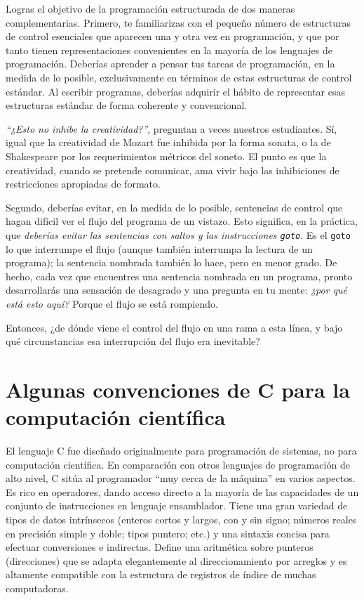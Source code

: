 \documentclass[10pt,a4paper]{book}
\begin{document}
\medskip

Logras el objetivo de la programación estructurada de dos maneras complementarias. Primero, te familiarizas con el pequeño número de estructuras de control esenciales que aparecen una y otra vez en programación, y que por tanto tienen representaciones convenientes en la mayoría de los lenguajes de programación. Deberías aprender a pensar tus tareas de programación, en la medida de lo posible, exclusivamente en términos de estas estructuras de control estándar. Al escribir programas, deberías adquirir el hábito de representar esas estructuras estándar de forma coherente y convencional.

\medskip

\textit{“¿Esto no inhibe la creatividad?”}, preguntan a veces nuestros estudiantes. Sí, igual que la creatividad de Mozart fue inhibida por la forma sonata, o la de Shakespeare por los requerimientos métricos del soneto. El punto es que la creatividad, cuando se pretende comunicar, ama vivir bajo las inhibiciones de restricciones apropiadas de formato.

\medskip

Segundo, deberías evitar, en la medida de lo posible, sentencias de control que hagan difícil ver el flujo del programa de un vistazo. Esto significa, en la práctica, que \textit{deberías evitar las sentencias con saltos y las instrucciones \texttt{goto}}. Es el \texttt{goto} lo que interrumpe el flujo (aunque también interrumpa la lectura de un programa); la sentencia nombrada también lo hace, pero en menor grado. De hecho, cada vez que encuentres una sentencia nombrada en un programa, pronto desarrollarás una sensación de desagrado y una pregunta en tu mente: \textit{¿por qué está esto aquí?} Porque el flujo se está rompiendo.

\medskip

Entonces, ¿de dónde viene el control del flujo en una rama a esta línea, y bajo qué circunstancias esa interrupción del flujo era inevitable?

\section{Algunas convenciones de C para la computación científica}

El lenguaje C fue diseñado originalmente para programación de sistemas, no para computación científica. En comparación con otros lenguajes de programación de alto nivel, C sitúa al programador “muy cerca de la máquina” en varios aspectos. Es rico en operadores, dando acceso directo a la mayoría de las capacidades de un conjunto de instrucciones en lenguaje ensamblador. Tiene una gran variedad de tipos de datos intrínsecos (enteros cortos y largos, con y sin signo; números reales en precisión simple y doble; tipos puntero; etc.) y una sintaxis concisa para efectuar conversiones e indirectas. Define una aritmética sobre punteros (direcciones) que se adapta elegantemente al direccionamiento por arreglos y es altamente compatible con la estructura de registros de índice de muchas computadoras.
\end{document}
